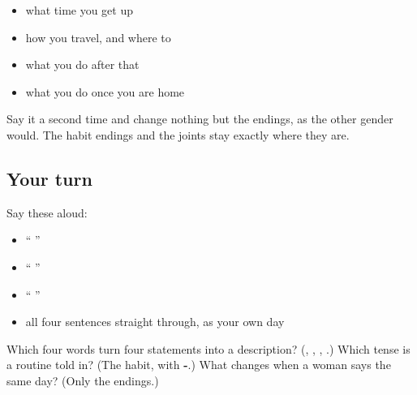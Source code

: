 \begin{itemize}
\raggedright
  \item what time you get up
  \item how you travel, and where to
  \item what you do after that
  \item what you do once you are home
\end{itemize}

Say it a second time and change nothing but the endings, as the other gender would. The habit endings and the joints stay exactly where they are.

\subsection*{Your turn}
Say these aloud:

\begin{itemize}
\raggedright
  \item \textquotedblleft{}      \textquotedblright{}
  \item \textquotedblleft{}      \textquotedblright{}
  \item \textquotedblleft{}      \textquotedblright{}
  \item all four sentences straight through, as your own day
\end{itemize}

\begin{tcolorbox}[breakable,colback=teal!4,colframe=teal!35!black,title={Before you move on}]
Which four words turn four statements into a description? (\textbf{}, \textbf{}, \textbf{}, \textbf{ }.) Which tense is a routine told in? (The habit, with \textbf{-}.) What changes when a woman says the same day? (Only the endings.)
\end{tcolorbox}
